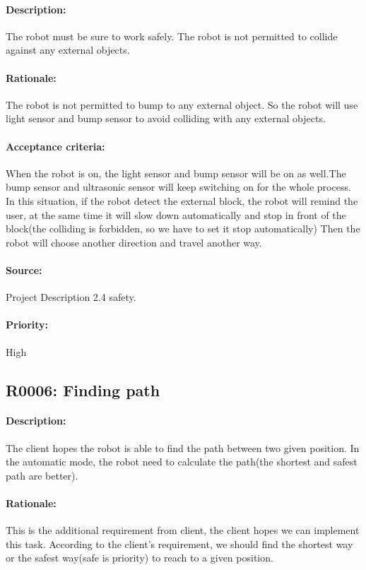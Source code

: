 \documentclass[11pt, a4paper]{report}
\begin{document}
\paragraph{Description:}
The robot must be sure to work safely. The robot is not permitted to collide against any external objects.
\paragraph{Rationale:}
The robot is not permitted to bump to any external object. So the robot will use light sensor and bump sensor to avoid colliding with any external objects.
\paragraph{Acceptance criteria:}
When the robot is on, the light sensor and bump sensor will be on as well.The bump sensor and ultrasonic sensor will keep switching on for the whole process. In this situation, if the robot detect the external block, the robot will remind the user, at the same time it will slow down automatically and stop in front of the block(the colliding is forbidden, so we have to set it stop automatically) Then the robot will choose another direction and travel another way.
\paragraph{Source:}
Project Description 2.4 safety.  
\paragraph{Priority:}
High


\subsection{R0006: Finding path }
\paragraph{Description:}
The client hopes the robot is able to find the path between two given position. In the automatic mode, the robot need to calculate the path(the shortest and safest path are better).    
\paragraph{Rationale:}
This is the additional requirement from client, the client hopes we can implement this task. According to the client's requirement, we should find the shortest way or the safest way(safe is priority) to reach to a given position. 
\end{document}
